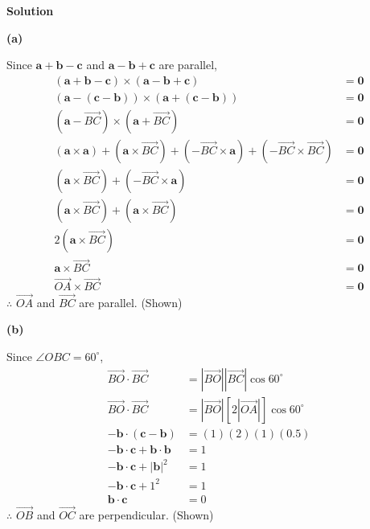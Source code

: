 \documentclass[a4paper,11pt,oneside]{book}
\begin{document}
\par\smallskip\noindent\textbf{Solution}\par \par\smallskip\noindent\textbf{(a)}\par\nopagebreak{}Since $\mathbf a+\mathbf b-\mathbf c$ and $\mathbf a-\mathbf b+\mathbf c$ are parallel,\begin{align*}(\mathbf a+\mathbf b-\mathbf c)\times(\mathbf a-\mathbf b+\mathbf c)&=\mathbf 0\\ (\mathbf a-(\mathbf c-\mathbf b))\times(\mathbf a+(\mathbf c-\mathbf b))&=\mathbf 0\\ \left(\mathbf a-\overrightarrow{BC}\right)\times\left(\mathbf a+\overrightarrow{BC}\right)&=\mathbf 0\\ (\mathbf a\times\mathbf a)+\left(\mathbf a\times\overrightarrow{BC}\right)+\left(-\overrightarrow{BC}\times\mathbf a\right)+\left(-\overrightarrow{BC}\times\overrightarrow{BC}\right)&=\mathbf 0\\ \left(\mathbf a\times\overrightarrow{BC}\right)+\left(-\overrightarrow{BC}\times\mathbf a\right)&=\mathbf 0\\ \left(\mathbf a\times\overrightarrow{BC}\right)+\left(\mathbf a\times\overrightarrow{BC}\right)&=\mathbf 0\\ 2\left(\mathbf a\times\overrightarrow{BC}\right)&=\mathbf 0\\ \mathbf a\times\overrightarrow{BC}&=\mathbf 0\\ \overrightarrow{OA}\times\overrightarrow{BC}&=\mathbf 0\end{align*}$\therefore$ $\overrightarrow{OA}$ and $\overrightarrow{BC}$ are parallel. (Shown)
\par\smallskip\noindent\textbf{(b)}\par\nopagebreak{}Since $\angle OBC=60^\circ$,\begin{align*}\overrightarrow{BO}\cdot\overrightarrow{BC}&=\left|\overrightarrow{BO}\right|\left|\overrightarrow{BC}\right|\cos60^\circ\\ \overrightarrow{BO}\cdot\overrightarrow{BC}&=\left|\overrightarrow{BO}\right|\left[2\left|\overrightarrow{OA}\right|\right]\cos60^\circ\\ -\mathbf b\cdot(\mathbf c-\mathbf b)&=(1)(2)(1)(0.5)\\ -\mathbf b\cdot\mathbf c+\mathbf b\cdot\mathbf b&=1\\ -\mathbf b\cdot\mathbf c+|\mathbf b|^2&=1\\ -\mathbf b\cdot\mathbf c+1^2&=1\\ \mathbf b\cdot\mathbf c&=0\end{align*}$\therefore$ $\overrightarrow{OB}$ and $\overrightarrow{OC}$ are perpendicular. (Shown)
\end{document}
